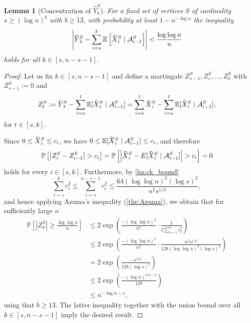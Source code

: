 \documentclass[a4paper,11pt]{article}
\theoremstyle{definition}
\theoremstyle{plain}
\newtheorem{lemma}{Lemma}
\newcommand{\A}{\mathcal A}
\newcommand{\prob}{\mathbb{P}}
\newcommand{\expect}{\mathbb{E}}
\newcommand{\capped}[1]{\hstretch{2}{\hat{\hstretch{.5}{#1}}}}
\DeclarePairedDelimiter{\abs}{\lvert}{\rvert}
\begin{document}
\begin{lemma}[Concentration of $\hat{Y}^S_k$]
  \label{lm:YCapConcentrate}
  For a fixed set of vertices $S$ of cardinality $s\ge (\log n)^{b}$ with $b\ge 13$, with probability at least $1 - n^{-\log n}$ the inequality
  \[
    \left| \capped{Y}_k^{S} - \sum_{i=s}^k \expect \left[ \capped{X}_i^{S} \mid \A_{i-1}^{S} \right] \right| < \frac{\log\log n}{n}
  \]
  holds for all $k\in [s, n-s-1]$.
\end{lemma}

\begin{proof}
  Let us fix $k\in [s, n - s - 1]$
  and define a martingale $Z^S_{s-1}, Z^S_{s}, \ldots, Z^S_{k}$ with $Z^S_{s-1}:= 0$ and
  \[
    Z_t^{S} := \capped{Y}_t^{S} - \sum_{i=s}^t \expect [ \capped{X}_i^{S} \mid \A_{i-1}^{S} ]
         = \sum_{i=s}^t \capped{X}_i^{S} - \sum_{i=s}^t \expect[\capped{X}_i^{S} \mid \A_{i-1}^{S}],
  \]
  for $t \in [s, k]$.

  Since $0 \leq \capped{X}_i^{S} \leq c_i$, we have
  $0 \leq \expect[\capped{X}_i^{S} \mid \A_{i-1}^{S}] \leq c_i$,
  and therefore
  \[
  \prob\left[\abs*{Z_{i}^{S}-Z_{i-1}^{S}}>c_i \right]
  =
  \prob\left[ \abs*{\capped{X}_i^{S} - E[\capped{X}_i^{S} \mid\A_{i-1}^{S}]} >c_i\right]
  = 0
  \]
  holds for every $i\in [s, k]$.
  Furthermore, by \cref{lm:ck_bound}
  \[
    \sum_{i=s}^{k} c_i^2
    \leq
    \sum_{i=s}^{n-s-1} c_i^2
    \leq
    \frac{64 (\log \log{n})^2 (\log s)^2}{n^2s^{1/3}},
  \]
  and hence applying Azuma's inequality (\cref{the:Azuma}), we obtain that for sufficiently large $n$
  \begin{equation*}
    \begin{split}
      \prob \left[ |Z^S_k|\geq\frac{\log \log n}{n} \right]
      &\leq
      2\exp\left(
      \frac{-(\log \log n)^2}{n^2} \cdot
      \frac{1}{2\sum_{i=1}^{k}c_k^2}
      \right)
      \\ &\leq
      2\exp\left(
      \frac{-(\log \log n)^2}{n^2} \cdot
      \frac{n^2 s^{1/3}}{128 (\log \log{n})^2 (\log s)^2}
      \right)
      \\ &=
      2\exp\left(
      \frac{-s^{1/3}}{128 (\log s)^2}
      \right)
      \\ &\leq
      2\exp\left(\frac{-(\log n)^{b/3 - 2}}{128}\right)
      \\ &\leq
      n^{-\log n - 1},
    \end{split}
  \end{equation*}
  using that $b\ge 13$.
  The latter inequality together with the union bound over all $k\in [s, n-s-1]$ imply the desired result.
\end{proof}
\end{document}
